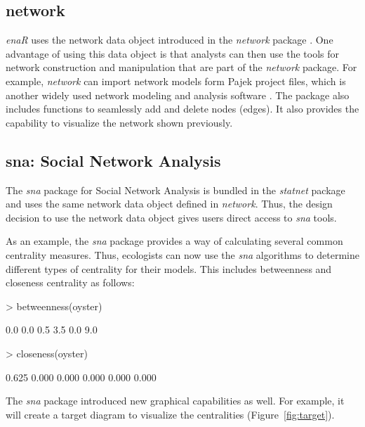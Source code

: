 \documentclass[article]{jss}
\begin{document}
\subsection{network}
\textit{enaR} uses the network data object introduced in the
\textit{network} package \citep{butts08_network}.  One advantage of
using this data object is that analysts can then use the tools for
network construction and manipulation that are part of the
\textit{network} package.  For example, \textit{network} can import
network models form Pajek project files, which is another widely used
network modeling and analysis software \citep{batajel07}.  The package
also includes functions to seamlessly add and delete nodes (edges).
It also provides the capability to visualize the network shown previously.

\subsection{sna: Social Network Analysis}
The \textit{sna} package for Social Network Analysis is bundled in the
\textit{statnet} package and uses the same network data object defined
in \textit{network}.  Thus, the design decision to use the network
data object gives users direct access to \textit{sna} tools.

As an example, the \textit{sna} package provides a way of calculating
several common centrality measures.  Thus, ecologists can now use the
\textit{sna} algorithms to determine different types of centrality for their
models.  This includes betweenness and closeness centrality as follows:

\begin{Schunk}
\begin{Sinput}
> betweenness(oyster)
\end{Sinput}
\begin{Soutput}
[1] 0.0 0.0 0.5 3.5 0.0 9.0
\end{Soutput}
\begin{Sinput}
> closeness(oyster)
\end{Sinput}
\begin{Soutput}
[1] 0.625 0.000 0.000 0.000 0.000 0.000
\end{Soutput}
\end{Schunk}

The \textit{sna} package introduced new graphical capabilities as
well. For example, it will create a target diagram to visualize the
centralities (Figure~\ref{fig:target}).
\end{document}
